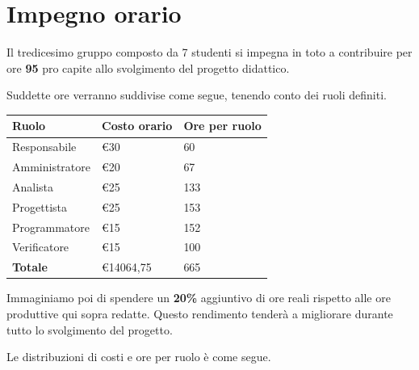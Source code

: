 \section{Impegno orario}

Il tredicesimo gruppo composto da 7 studenti si impegna in toto a contribuire per ore \textbf{95} pro capite allo svolgimento del progetto didattico.

Suddette ore verranno suddivise come segue, tenendo conto dei ruoli definiti.

\begin{center}
    \begin{tabularx}{10cm}{X |l|l}
        \textbf{Ruolo}  & \textbf{Costo orario} & \textbf{Ore per ruolo} \\
        \hline
        Responsabile    & €30                   & 60                     \\
        Amministratore  & €20                   & 67                     \\
        Analista        & €25                   & 133                    \\
        Progettista     & €25                   & 153                    \\
        Programmatore   & €15                   & 152                    \\
        Verificatore    & €15                   & 100                    \\
        \hline
        \textbf{Totale} & €14064,75             & 665
    \end{tabularx}
\end{center}

Immaginiamo poi di spendere un \textbf{20\%} aggiuntivo di ore reali rispetto alle ore produttive qui sopra redatte. Questo rendimento tenderà a migliorare durante tutto lo svolgimento del progetto.

Le distribuzioni di costi e ore per ruolo è come segue.

